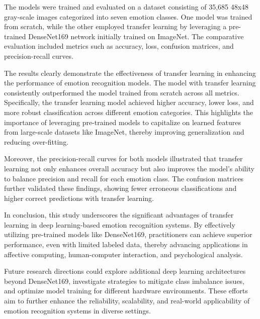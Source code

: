 \documentclass[conference]{IEEEtran}
\begin{document}
The models were trained and evaluated on a dataset consisting of 35,685 48x48 gray-scale images categorized into seven emotion classes. One model was trained from scratch, while the other employed transfer learning by leveraging a pre-trained DenseNet169 network initially trained on ImageNet. The comparative evaluation included metrics such as accuracy, loss, confusion matrices, and precision-recall curves.

The results clearly demonstrate the effectiveness of transfer learning in enhancing the performance of emotion recognition models. The model with transfer learning consistently outperformed the model trained from scratch across all metrics. Specifically, the transfer learning model achieved higher accuracy, lower loss, and more robust classification across different emotion categories. This highlights the importance of leveraging pre-trained models to capitalize on learned features from large-scale datasets like ImageNet, thereby improving generalization and reducing over-fitting.

Moreover, the precision-recall curves for both models illustrated that transfer learning not only enhances overall accuracy but also improves the model's ability to balance precision and recall for each emotion class. The confusion matrices further validated these findings, showing fewer erroneous classifications and higher correct predictions with transfer learning.

In conclusion, this study underscores the significant advantages of transfer learning in deep learning-based emotion recognition systems. By effectively utilizing pre-trained models like DenseNet169, practitioners can achieve superior performance, even with limited labeled data, thereby advancing applications in affective computing, human-computer interaction, and psychological analysis.

Future research directions could explore additional deep learning architectures beyond DenseNet169, investigate strategies to mitigate class imbalance issues, and optimize model training for different hardware environments. These efforts aim to further enhance the reliability, scalability, and real-world applicability of emotion recognition systems in diverse settings.



\end{document}
